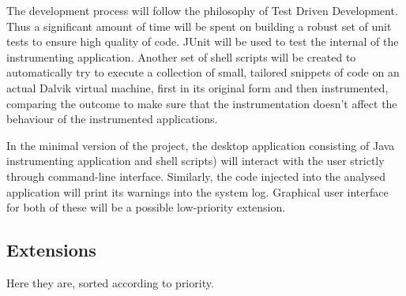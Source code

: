 \documentclass[12pt]{article}
\begin{document}
The development process will follow the philosophy of Test Driven 
Development. Thus a significant amount of time will be spent on building 
a robust set of unit tests to ensure high quality of code. JUnit will be 
used to test the internal of the instrumenting application. Another set of 
shell scripts will be created to automatically try to execute a collection
of small, tailored snippets of code on an actual Dalvik virtual machine, 
first in its original form and then instrumented, comparing the outcome
to make sure that the instrumentation doesn't affect the behaviour of 
the instrumented applications.

In the minimal version of the project, the desktop application consisting of
Java instrumenting application and shell scripts) will interact with the user
strictly through command-line interface. Similarly, the code injected into 
the analysed application will print its warnings into the system log. 
Graphical user interface for both of these will be a possible low-priority 
extension.

\subsection*{Extensions}

Here they are, sorted according to priority.
\end{document}
